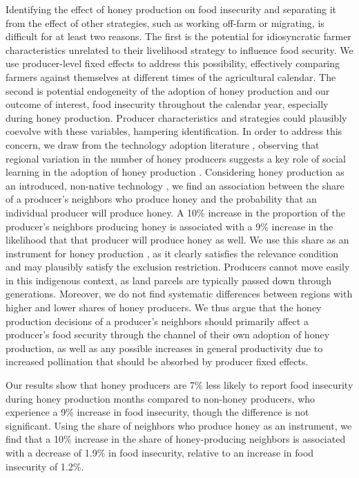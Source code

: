 \documentclass[../main.tex]{subfiles}
\begin{document}
Identifying the effect of honey production on food insecurity and separating it from the effect of other strategies, such as working off-farm or migrating, is difficult for at least two reasons. The first is the potential for idiosyncratic farmer characteristics unrelated to their livelihood strategy to influence food security. We use producer-level fixed effects to address this possibility, effectively comparing farmers against themselves at different times of the agricultural calendar. The second is potential endogeneity of the adoption of honey production and our outcome of interest,  food insecurity throughout the calendar year, especially during honey production. Producer characteristics and strategies could plausibly coevolve with these variables, hampering identification. In order to address this concern, we draw from the technology adoption literature \parencite{fosterMicroeconomicsTechnologyAdoption2010}, observing that regional variation in the number of honey producers suggests a key role of social learning in the adoption of honey production \parencite{fosterLearningDoingLearning1995}. Considering honey production as an introduced, non-native technology \parencite{conleyLearningNewTechnology2010}, we find an association between the share of a producer's neighbors who produce honey and the probability that an individual producer will produce honey. A 10\% increase in the proportion of the producer's neighbors producing honey is associated with a 9\% increase in the likelihood that that producer will produce honey as well. We use this share as an instrument for honey production \parencite{sellareSustainabilityStandardsBenefit2020}, as it clearly satisfies the relevance condition and may plausibly satisfy the exclusion restriction. Producers cannot move easily in this indigenous context, as land parcels are typically passed down through generations. Moreover, we do not find systematic differences between regions with higher and lower shares of honey producers. We thus argue that the honey production decisions of a producer's neighbors should primarily affect a producer's food security through the channel of their own adoption of honey production, as well as any possible  increases in general productivity due to increased pollination that should be absorbed by producer fixed effects.

Our results show that honey producers are 7\% less likely to report food insecurity during honey production months compared to non-honey producers, who experience a 9\% increase in food insecurity, though the difference is not significant. Using the share of neighbors who produce honey as an instrument, we find that a 10\% increase in the share of honey-producing
neighbors is associated with a decrease of 1.9\% in food insecurity, relative to an increase in food insecurity of 1.2\%. 
\end{document}
